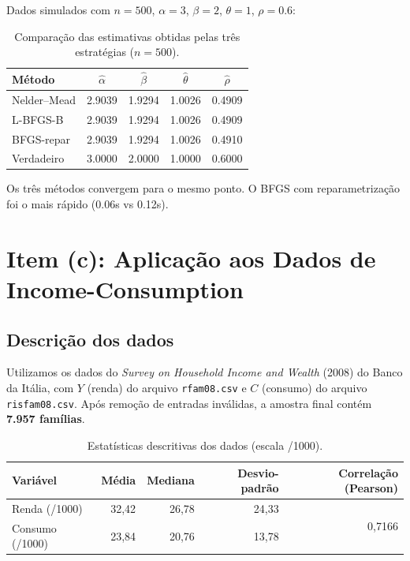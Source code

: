 \documentclass[12pt,a4paper]{article}
\begin{document}
Dados simulados com $n=500$, $\alpha=3$, $\beta=2$, $\theta=1$, $\rho=0.6$:

\begin{table}[H]
\centering
\begin{tabular}{lcccc}
\toprule
Método & $\hat\alpha$ & $\hat\beta$ & $\hat\theta$ & $\hat\rho$ \\
\midrule
Nelder--Mead & 2.9039 & 1.9294 & 1.0026 & 0.4909 \\
L-BFGS-B & 2.9039 & 1.9294 & 1.0026 & 0.4909 \\
BFGS-repar & 2.9039 & 1.9294 & 1.0026 & 0.4910 \\
\midrule
Verdadeiro & 3.0000 & 2.0000 & 1.0000 & 0.6000 \\
\bottomrule
\end{tabular}
\caption{Comparação das estimativas obtidas pelas três estratégias ($n=500$).}
\end{table}

Os três métodos convergem para o mesmo ponto. O BFGS com reparametrização foi o mais rápido (0.06s vs 0.12s).

\section{Item (c): Aplicação aos Dados de Income-Consumption}

\subsection{Descrição dos dados}

Utilizamos os dados do \textit{Survey on Household Income and Wealth} (2008) do Banco da Itália, com $Y$ (renda) do arquivo \texttt{rfam08.csv} e $C$ (consumo) do arquivo \texttt{risfam08.csv}. Após remoção de entradas inválidas, a amostra final contém \textbf{7.957 famílias}.

\begin{table}[H]
\centering
\begin{tabular}{lrrrr}
\toprule
Variável & Média & Mediana & Desvio-padrão & Correlação (Pearson) \\
\midrule
Renda (/1000) & 32,42 & 26,78 & 24,33 & \multirow{2}{*}{0,7166} \\
Consumo (/1000) & 23,84 & 20,76 & 13,78 & \\
\bottomrule
\end{tabular}
\caption{Estatísticas descritivas dos dados (escala /1000).}
\end{table}
\end{document}
